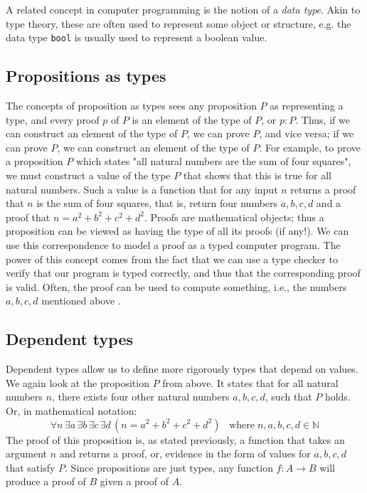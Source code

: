 A related concept in computer programming is the notion of a \emph{data type}.
Akin to type theory, these are often used to represent some object or structure,
e.g. the data type \texttt{bool} is usually used to represent a boolean value.

\subsection{Propositions as types}
\label{ssec:propositions_as_types}

The concepts of proposition as types sees any proposition $P$ as representing a type,
and every proof $p$ of $P$ is an element of the type of $P$, or $p : P$.
Thus, if we can construct an element of the type of $P$, we can prove $P$,
and vice versa; if we can prove $P$, we can construct an element of the type of $P$.
For example, to prove a proposition $P$ which states "all natural numbers are the sum of four squares",
we must construct a value of the type $P$ that shows that this is true for all natural numbers.
Such a value is a function that for any input $n$ returns a proof that $n$ is the sum of four squares,
that is, return four numbers $a, b, c, d$ and a proof that $n = a^2 + b^2 + c^2 + d^2$.
Proofs are mathematical objects; thus a proposition can be viewed as having the type of all its proofs (if any!).
We can use this correspondence to model a proof as a typed computer program.
The power of this concept comes from the fact that we can use a type checker to verify that
our program is typed correctly, and thus that the corresponding proof is valid.
Often, the proof can be used to compute something, i.e., the numbers $a, b, c, d$ mentioned above
\cite{pwadler}.

\subsection{Dependent types}
\label{ssec:dependent_types}

Dependent types allow us to define more rigorously types that depend on values.
We again look at the proposition $P$ from above.
It states that for all natural numbers $n$,
there exists four other natural numbers $a, b, c, d$,
such that $P$ holds.
Or, in mathematical notation:
$$
\forall n \, \exists a \, \exists b \, \exists c \, \exists d \, (n = a^2 + b^2 + c^2 + d^2) \;\;\;
\text{where} \; n, a, b, c, d \in \mathbb{N}
$$
The proof of this proposition is, as stated previously,
a function that takes an argument $n$ and returns a proof, or,
evidence in the form of values for $a, b, c, d$ that satisfy $P$.
Since propositions are just types, any function $f : A \rightarrow B$
will produce a proof of $B$ given a proof of $A$.

